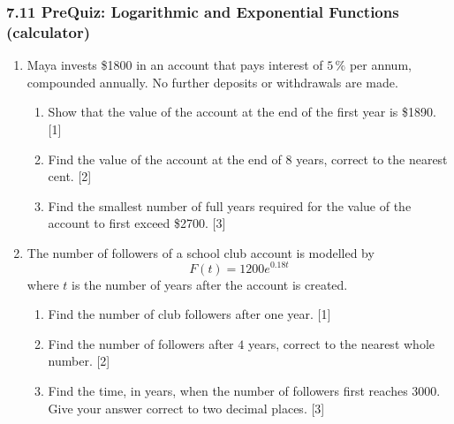 \documentclass[12pt, twoside]{article}
\begin{document}
\subsubsection*{7.11 PreQuiz: Logarithmic and Exponential Functions
(calculator)}

\begin{enumerate}[itemsep=0.15cm]

\item[1.] [Maximum mark: 6]

Maya invests \$1800 in an account that pays interest of $5\,\%$ per
annum, compounded annually. No further deposits or withdrawals are made.

\begin{enumerate}[itemsep=0.1cm]
  \item Show that the value of the account at the end of the first year
  is \$1890. \hfill [1]
  \item Find the value of the account at the end of $8$ years, correct
  to the nearest cent. \hfill [2]
  \item Find the smallest number of full years required for the value of
  the account to first exceed \$2700. \hfill [3]
\end{enumerate}


\newpage

\item[2.] [Maximum mark: 6]

The number of followers of a school club account is modelled by
$$F(t) = 1200 e^{0.18t}$$
where $t$ is the number of years after the account is created.

\begin{enumerate}[itemsep=0.1cm]
  \item Find the number of club followers after one year. \hfill [1]
  \item Find the number of followers after $4$ years, correct to the
  nearest whole number. \hfill [2]
  \item Find the time, in years, when the number of followers first
  reaches $3000$. Give your answer correct to two decimal places.
  \hfill [3]
\end{enumerate}


\end{enumerate}
\end{document}
